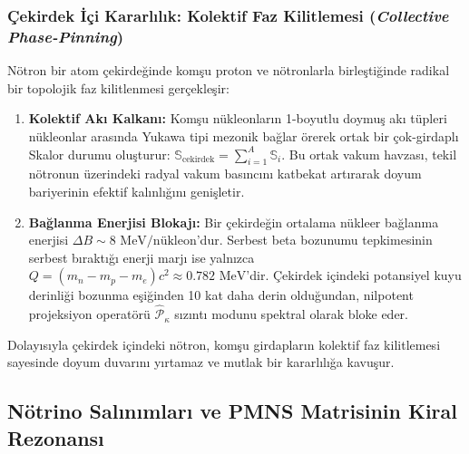 \documentclass[11pt,a4paper]{article}
\begin{document}
\subsubsection{Çekirdek İçi Kararlılık: Kolektif Faz Kilitlemesi (\textit{Collective Phase-Pinning})}
Nötron bir atom çekirdeğinde komşu proton ve nötronlarla birleştiğinde radikal bir topolojik faz kilitlenmesi gerçekleşir:
\begin{enumerate}
    \item \textbf{Kolektif Akı Kalkanı:} Komşu nükleonların 1-boyutlu doymuş akı tüpleri nükleonlar arasında Yukawa tipi mezonik bağlar örerek ortak bir çok-girdaplı Skalor durumu oluşturur: $\mathbb{S}_{\mathrm{cekirdek}} = \sum_{i=1}^A \mathbb{S}_i$. Bu ortak vakum havzası, tekil nötronun üzerindeki radyal vakum basıncını katbekat artırarak doyum bariyerinin efektif kalınlığını genişletir.
    \item \textbf{Bağlanma Enerjisi Blokajı:} Bir çekirdeğin ortalama nükleer bağlanma enerjisi $\Delta B \sim 8\text{ MeV/nükleon}$'dur. Serbest beta bozunumu tepkimesinin serbest bıraktığı enerji marjı ise yalnızca $Q = (m_n - m_p - m_e)c^2 \approx 0.782\text{ MeV}$'dir. Çekirdek içindeki potansiyel kuyu derinliği bozunma eşiğinden 10 kat daha derin olduğundan, nilpotent projeksiyon operatörü $\hat{\mathcal{P}}_\kappa$ sızıntı modunu spektral olarak bloke eder.
\end{enumerate}
Dolayısıyla çekirdek içindeki nötron, komşu girdapların kolektif faz kilitlemesi sayesinde doyum duvarını yırtamaz ve mutlak bir kararlılığa kavuşur.

\subsection{Nötrino Salınımları ve PMNS Matrisinin Kiral Rezonansı}
\label{sec:notrino_pmns_paper4}
\end{document}
